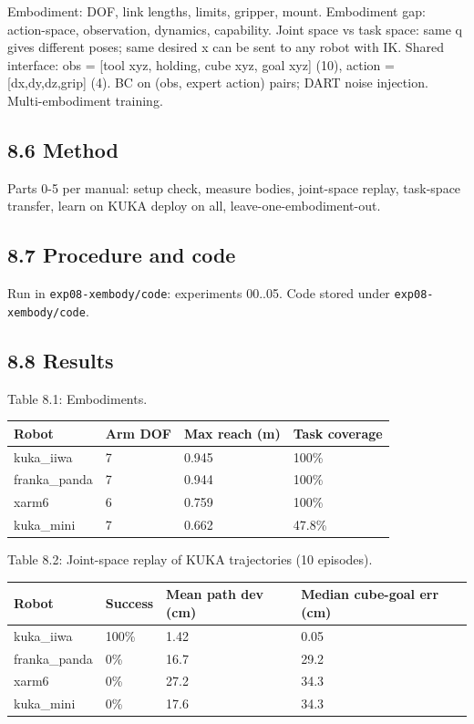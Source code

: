 \documentclass[
]{article}
\newcounter{none} %
\begin{document}
Embodiment: DOF, link lengths, limits, gripper, mount. Embodiment gap:
action-space, observation, dynamics, capability. Joint space vs task
space: same q gives different poses; same desired x can be sent to any
robot with IK. Shared interface: obs = {[}tool xyz, holding, cube xyz,
goal xyz{]} (10), action = {[}dx,dy,dz,grip{]} (4). BC on (obs, expert
action) pairs; DART noise injection. Multi-embodiment training.

\subsection{8.6 Method}\label{method-7}

Parts 0-5 per manual: setup check, measure bodies, joint-space replay,
task-space transfer, learn on KUKA deploy on all,
leave-one-embodiment-out.

\subsection{8.7 Procedure and code}\label{procedure-and-code-7}

Run in \texttt{exp08-xembody/code}: experiments 00..05. Code stored
under \texttt{exp08-xembody/code}.

\subsection{8.8 Results}\label{results-7}

Table 8.1: Embodiments.

{\def\LTcaptype{none} %
\begin{longtable}[]{@{}llll@{}}
\toprule\noalign{}
Robot & Arm DOF & Max reach (m) & Task coverage \\
\midrule\noalign{}
\endhead
\bottomrule\noalign{}
\endlastfoot
kuka\_iiwa & 7 & 0.945 & 100\% \\
franka\_panda & 7 & 0.944 & 100\% \\
xarm6 & 6 & 0.759 & 100\% \\
kuka\_mini & 7 & 0.662 & 47.8\% \\
\end{longtable}
}

Table 8.2: Joint-space replay of KUKA trajectories (10 episodes).

{\def\LTcaptype{none} %
\begin{longtable}[]{@{}llll@{}}
\toprule\noalign{}
Robot & Success & Mean path dev (cm) & Median cube-goal err (cm) \\
\midrule\noalign{}
\endhead
\bottomrule\noalign{}
\endlastfoot
kuka\_iiwa & 100\% & 1.42 & 0.05 \\
franka\_panda & 0\% & 16.7 & 29.2 \\
xarm6 & 0\% & 27.2 & 34.3 \\
kuka\_mini & 0\% & 17.6 & 34.3 \\
\end{longtable}
}
\end{document}
